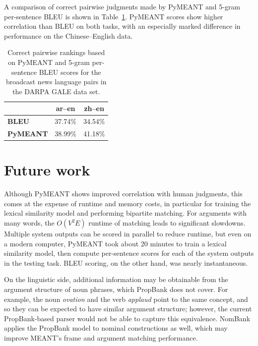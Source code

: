 \documentclass[11pt,twocolumn]{article}
\begin{document}
A comparison of correct pairwise judgments made by PyMEANT and 5-gram
per-sentence BLEU is shown in Table~\ref{tab:results}.
PyMEANT scores show higher correlation than BLEU on both tasks, with an
especially marked difference in performance on the Chinese--English
data.

\begin{table}
\center
\begin{tabular}{l|cc}
&
\textbf{ar--en} &
\textbf{zh--en} \\
\hline
\textbf{BLEU} &
37.74\% &
34.54\% \\
\textbf{PyMEANT} &
38.99\% &
41.18\%
\end{tabular}
\caption{\label{tab:results}
Correct pairwise rankings based on PyMEANT and 5-gram per-sentence BLEU
scores for the broadcast news language pairs in the DARPA GALE data set.
}
\end{table}


\section{Future work}

Although PyMEANT shows improved correlation with human judgments, this
comes at the expense of runtime and memory costs, in particular for
training the lexical similarity model and performing bipartite matching.
For arguments with many words, the $O(V^2 E)$ runtime of matching leads
to significant slowdowns.
Multiple system outputs can be scored in parallel to reduce runtime,
but even on a modern computer, PyMEANT took about 20 minutes to train a
lexical similarity model, then compute per-sentence scores for each of
the system outputs in the testing task.
BLEU scoring, on the other hand, was nearly instantaneous.

On the linguistic side, additional information may be obtainable from
the argument structure of noun phrases, which PropBank does not cover.
For example, the noun \textit{ovation} and the verb \textit{applaud}
point to the same concept, and so they can be expected to have similar
argument structure; however, the current PropBank-based parser would
not be able to capture this equivalence.
NomBank \cite{Meyers:2004} applies the PropBank model to nominal
constructions as well, which may improve MEANT's frame and argument
matching performance.
\end{document}
